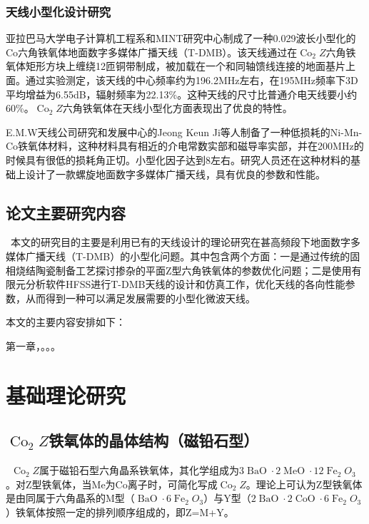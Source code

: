 \documentclass{article}
\newcommand{\tmop}[1]{\ensuremath{\operatorname{#1}}}
\begin{document}
\subsubsection{天线小型化设计研究}

亚拉巴马大学电子计算机工程{\cite{lzs-nieyan}}系和MINT研究中心制成了一种0.029波长小型化的Co六角铁氧体地面数字多媒体广播天线（T-DMB）。该天线通过在$\tmop{Co}_2
Z$六角铁氧体矩形方块上缠绕12匝铜带制成，被加载在一个和同轴馈线连接的地面基片上面。通过实验测定，该天线的中心频率约为196.2MHz左右，在195MHz频率下3D平均增益为6.55dB，辐射频率为22.13\%。这种天线的尺寸比普通介电天线要小约60\%。$\tmop{Co}_2
Z$六角铁氧体在天线小型化方面表现出了优良的特性。

E.M.W天线公司研究和发展中心的Jeong Keun
Ji等人制备了一种低损耗的Ni-Mn-Co铁氧体材料，这种材料具有相近的介电常数实部和磁导率实部，并在200MHz的时候具有很低的损耗角正切。小型化因子达到8左右。研究人员还在这种材料的基础上设计了一款螺旋地面数字多媒体广播天线，具有优良的参数和性能。

\subsection{论文主要研究内容}

\
本文的研究目的主要是利用已有的天线设计的理论研究在甚高频段下地面数字多媒体广播天线（T-DMB）的小型化问题。其中包含两个方面：一是通过传统的固相烧结陶瓷制备工艺探讨掺杂的平面Z型六角铁氧体的参数优化问题；二是使用有限元分析软件HFSS进行T-DMB天线的设计和仿真工作，优化天线的各向性能参数，从而得到一种可以满足发展需要的小型化微波天线。

本文的主要内容安排如下：

第一章，。。。



\section{基础理论研究}

\subsection{$\tmop{Co}_2 Z$铁氧体的晶体结构（磁铅石型）}

\ $\tmop{Co}_2
Z$属于磁铅石型六角晶系铁氧体，其化学组成为$3 \tmop{BaO}
\cdot 2 \tmop{MeO} \cdot 12 \tmop{Fe}_2
O_3$。对Z型铁氧体，当Me为Co离子时，可简化写成$\tmop{Co}_2
Z$。理论上可认为Z型铁氧体是由同属于六角晶系的M型（$\tmop{BaO}
\cdot 6 \tmop{Fe}_2 O_3$）与Y型（$2 \tmop{BaO} \cdot 2 \tmop{CoO} \cdot 6
\tmop{Fe}_2 O_3$）铁氧体按照一定的排列顺序组成的，即Z=M+Y。
\end{document}
